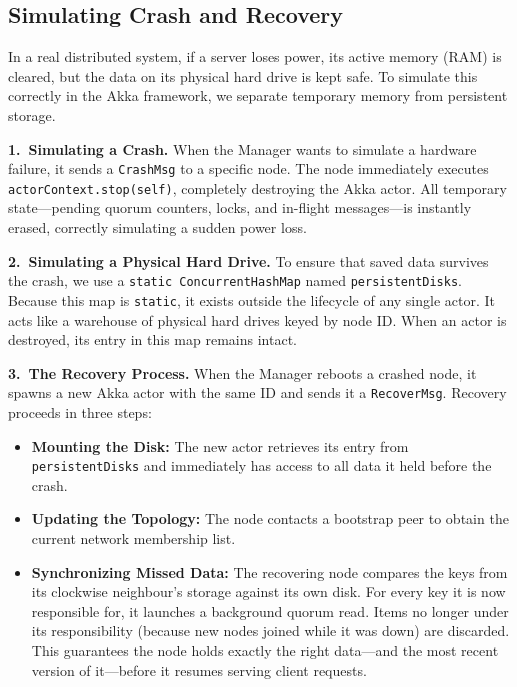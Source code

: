 \subsection{Simulating Crash and Recovery}
In a real distributed system, if a server loses power, its active memory (RAM)
is cleared, but the data on its physical hard drive is kept safe. To simulate
this correctly in the Akka framework, we separate temporary memory from
persistent storage.

\textbf{1.~Simulating a Crash.}
When the Manager wants to simulate a hardware failure, it sends a
\texttt{CrashMsg} to a specific node. The node immediately executes
\texttt{actorContext.stop(self)}, completely destroying the Akka actor. All
temporary state---pending quorum counters, locks, and in-flight
messages---is instantly erased, correctly simulating a sudden power loss.

\textbf{2.~Simulating a Physical Hard Drive.}
To ensure that saved data survives the crash, we use a \texttt{static
ConcurrentHashMap} named \texttt{persistentDisks}. Because this map is
\texttt{static}, it exists outside the lifecycle of any single actor. It acts
like a warehouse of physical hard drives keyed by node ID. When an actor is
destroyed, its entry in this map remains intact.

\textbf{3.~The Recovery Process.}
When the Manager reboots a crashed node, it spawns a new Akka actor with the
same ID and sends it a \texttt{RecoverMsg}. Recovery proceeds in three steps:
\begin{itemize}
    \item \textbf{Mounting the Disk:} The new actor retrieves its entry from
        \texttt{persistentDisks} and immediately has access to all data it
        held before the crash.
    \item \textbf{Updating the Topology:} The node contacts a bootstrap peer
        to obtain the current network membership list.
    \item \textbf{Synchronizing Missed Data:} The recovering node compares the
        keys from its clockwise neighbour's storage against its own disk.
        For every key it is now responsible for, it launches a background
        quorum read. Items no longer under its responsibility (because new
        nodes joined while it was down) are discarded. This guarantees the
        node holds exactly the right data---and the most recent version of
        it---before it resumes serving client requests.
\end{itemize}

